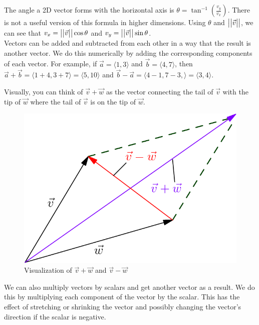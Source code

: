 \noindent
The angle a 2D vector forms with the horizontal axis is $\theta = \tan^{-1}{\left(\frac{v_y}{v_x}\right)}$.
There is not a useful version of this formula in higher dimensions.
Using $\theta$ and $\big\lvert \big\lvert \vec{v} \big\rvert \big\rvert$, we can see that $v_x = \big\lvert \big\lvert \vec{v} \big\rvert \big\rvert\cos{\theta}$ and $v_y = \big\lvert \big\lvert \vec{v} \big\rvert \big\rvert\sin{\theta}$.\\

\noindent
Vectors can be added and subtracted from each other in a way that the result is another vector.
We do this numerically by adding the corresponding components of each vector.
For example, if $\vec{a} = \langle 1,3 \rangle$ and $\vec{b} = \langle 4,7 \rangle$, then $\vec{a}+\vec{b} = \langle 1+4, 3+7 \rangle = \langle 5,10 \rangle$
and $\vec{b}-\vec{a} = \langle 4-1, 7-3, \rangle = \langle 3,4 \rangle$.

\noindent
Visually, you can think of $\vec{v}+\vec{w}$ as the vector connecting the tail of $\vec{v}$ with the tip of $\vec{w}$ where the tail of $\vec{v}$ is on the tip of $\vec{w}$.

\begin{figure}[H]
	\centering
	\includegraphics[scale=0.33]{./Images/backgroundReview/Parallelogram.png}
	\caption{Visualization of $\vec{v}+\vec{w}$ and $\vec{v} - \vec{w}$}
\end{figure}

\noindent
We can also multiply vectors by scalars and get another vector as a result. We do this by multiplying each component of the vector by the scalar. This has the effect of stretching or shrinking the vector and possibly changing the vector's direction if the scalar is negative.

